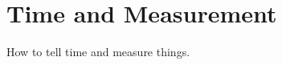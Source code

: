 \chapter{Time and Measurement}
\label{cha:tvk-time-measurement}

How to tell time and measure things.